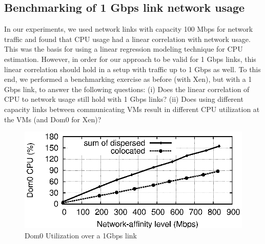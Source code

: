 


\subsection{Benchmarking of 1 Gbps link network usage}
\label{ref:1gbps}
In our experiments, we used network links with capacity 100 Mbps 
for network traffic
and found that CPU usage had a linear correlation with network usage.
This was the basis for using a linear regression modeling technique
for CPU estimation. However, in order for our approach to be valid
for 1 Gbps links, this linear correlation should hold in a setup with
traffic up to 1 Gbps as well. To this end, we performed a benchmarking
exercise as before (with Xen), but with a 1 Gbps link, to answer
the following questions:
(i) Does the linear correlation of CPU to network usage still hold 
with 1 Gbps links?
(ii) Does using different capacity links between communicating VMs 
result in different CPU utilization at the VMs (and Dom0 for Xen)?

\begin{figure}[t]
\centering
\includegraphics[scale=0.75]{jss-figures/new-aff-1G-benchmark/multi-bytetcp-1Gbps-nogsotsoboth-0iptabs-5120-dom0-cpu-vs-affine-curve.eps}
\caption{Dom0 Utilization over a 1Gbps link}
\label{fig:link1gbps}
\end{figure}



